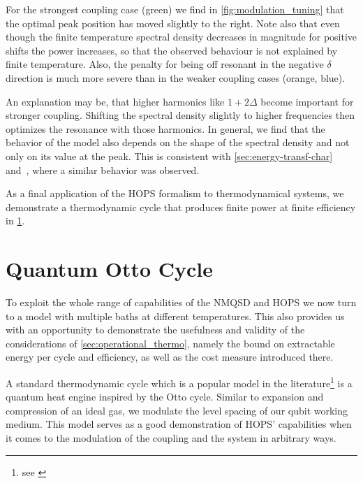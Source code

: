 For the strongest coupling case (green) we find in
\cref{fig:modulation_tuning} that the optimal peak position has moved
slightly to the right.  Note also that even though the finite
temperature spectral density decreases in magnitude for positive
shifts the power increases, so that the observed behaviour is not
explained by finite temperature. Also, the penalty for being off
resonant in the negative \(δ\) direction is much more severe than in
the weaker coupling cases (orange, blue).

An explanation may be, that higher harmonics like \(1+ 2 Δ\) become
important for stronger coupling. Shifting the spectral density
slightly to higher frequencies then optimizes the resonance with those
harmonics. In general, we find that the behavior of the model also
depends on the shape of the spectral density and not only on its value
at the peak. This is consistent with \cref{sec:energy-transf-char}
and~\cite{Xu2022Mar}, where a similar behavior was observed.

As a final application of the HOPS formalism to thermodynamical
systems, we demonstrate a thermodynamic cycle that produces finite
power at finite efficiency in \cref{sec:otto}.

\section{Quantum Otto Cycle}%
\label{sec:otto}
To exploit the whole range of capabilities of the NMQSD and HOPS we
now turn to a model with multiple baths at different
temperatures. This also provides us with an opportunity to demonstrate
the usefulness and validity of the considerations of
\cref{sec:operational_thermo}, namely the bound on extractable energy
per cycle and efficiency, as well as the cost measure introduced
there.

A standard thermodynamic cycle which is a popular model in the
literature\footnote{see
  \cite{Wiedmann2021Jun,Karimi2016Nov,Binder2018}} is a quantum heat
engine inspired by the Otto cycle. Similar to expansion and
compression of an ideal gas, we modulate the level spacing of our
qubit working medium. This model serves as a good demonstration of
HOPS' capabilities when it comes to the modulation of the coupling and
the system in arbitrary ways.

